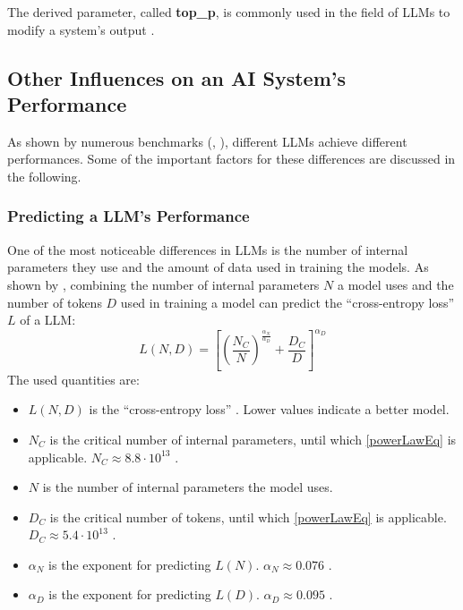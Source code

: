 \documentclass[
	fontsize = 11pt,
	paper = a4,
	draft = false,
	twoside = true,
	titlepage = false
]{scrartcl}
\numberwithin{equation}{subsection}
\begin{document}
	The derived parameter, called \textbf{top\_p}, is commonly used in the field of \gls{LLM}s to modify a system's output \autocite[p.~13]{llmDetail}.
	
	\subsection{Other Influences on an \gls{AI} System's Performance}
	As shown by numerous benchmarks (\autocite{huggArena}, \autocite{faceLeaderBoard}), different \gls{LLM}s achieve different performances. Some of the important factors for these differences are discussed in the following.
	\subsubsection{Predicting a \gls{LLM}'s Performance}
	One of the most noticeable differences in \gls{LLM}s is the number of internal parameters they use and the amount of data used in training the models. As shown by \citeauthor{powerLaw} \autocite[p.~5]{powerLaw}, combining the number of internal parameters $N$ a model uses and the number of \glspl{token} $D$ used in training a model can predict the \enquote{cross-entropy loss} \autocite[p.~6]{powerLaw} $L$ of a \gls{LLM}:
	\begin{equation}
		L(N,D) = \left[\left(\frac{N_C}{N}\right)^{\frac{\alpha_N}{\alpha_D}} + \frac{D_C}{D}\right]^{\alpha_D} \label{powerLawEq}
	\end{equation}
	The used quantities are:
	\begin{itemize}
		\item $L(N,D)$ is the \enquote{cross-entropy loss} \autocite[p.~6]{powerLaw}. Lower values indicate a better model.
		\item $N_C$ is the critical number of internal parameters, until which \autoref{powerLawEq} is applicable. $N_C \approx 8.8 \cdot 10^{13}$ \autocite{powerLaw}.
		\item $N$ is the number of internal parameters the model uses.
		\item $D_C$ is the critical number of \glspl{token}, until which \autoref{powerLawEq} is applicable. $D_C \approx 5.4 \cdot 10^{13}$ \autocite{powerLaw}.
		\item $\alpha_N$ is the exponent for predicting $L(N)$. $\alpha_N \approx 0.076$ \autocite{powerLaw}.
		\item $\alpha_D$ is the exponent for predicting $L(D)$. $\alpha_D \approx 0.095$ \autocite{powerLaw}.
	\end{itemize}
	
\end{document}
